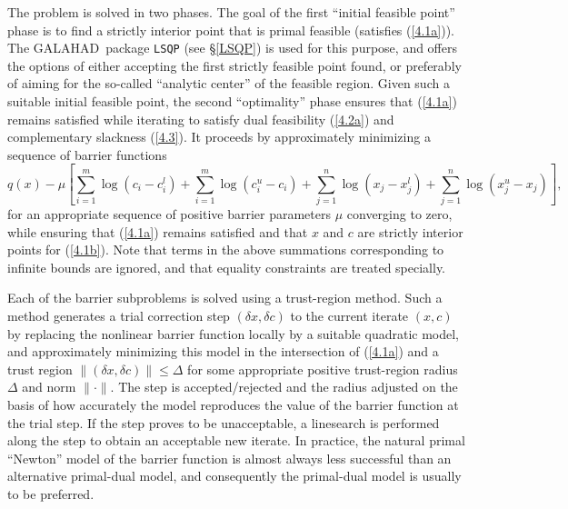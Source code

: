 \documentclass[acmtocl,acmnow]{acmtrans2m}
\newcommand{\req}[1]{(\ref{#1})}
\newcommand{\gal}{{\sf GALAHAD}}
\newcommand{\disp}[1]{\[{#1}\]}
\begin{document}
The problem is solved in two phases. The goal of the first 
``initial feasible point'' phase is
to find a strictly interior point that is primal feasible (satisfies
\req{4.1a}). The \gal\ package {\tt LSQP} (see \S\ref{LSQP})
is used for this purpose, and offers the options of either accepting the first 
strictly feasible point found, or preferably of aiming for the
so-called ``analytic center'' of the feasible region.
Given such a suitable initial feasible point, the second ``optimality''
phase ensures that \req{4.1a} remains satisfied while iterating to
satisfy dual feasibility \req{4.2a} and complementary slackness \req{4.3}.
It proceeds by approximately minimizing a 
sequence of barrier functions
\disp{q(x) - \mu \left[ \sum_{i=1}^{m} \log ( c_{i}  -  c_{i}^{l} )
 + \sum_{i=1}^{m} \log ( c_{i}^{u}  -  c_{i} )
 + \sum_{j=1}^{n} \log ( x_{j}  -  x_{j}^{l} ) 
 + \sum_{j=1}^{n} \log ( x_{j}^{u}  -  x_{j} ) \right] ,}
for an appropriate sequence of positive barrier parameters $\mu$ 
converging to zero,
while ensuring that \req{4.1a} remains satisfied and that 
$x$ and $c$ are strictly interior points for \req{4.1b}. 
Note that terms in the above summations corresponding to infinite bounds are
ignored, and that equality constraints are treated specially.

Each of the barrier subproblems is solved using a trust-region method.
Such a method generates a trial correction step $(\delta x, \delta c)$
to the current iterate $(x, c)$
by replacing the nonlinear barrier function locally by a suitable 
quadratic model, and approximately minimizing this model in the 
intersection of \req{4.1a}
and a trust region $\|( \delta x,  \delta c)\| \leq \Delta$
for some appropriate
positive trust-region radius $\Delta$ and norm $\| \cdot \|$.
The step is accepted/rejected
and the radius adjusted on the basis of how accurately the model reproduces the
value of the barrier function at the trial step. If the step proves to be 
unacceptable, a linesearch is performed along the step to obtain an acceptable 
new iterate. In practice, the natural primal ``Newton'' model of the barrier 
function is almost always 
less successful than an alternative primal-dual model, 
and consequently the primal-dual model is usually to be preferred.
\end{document}
